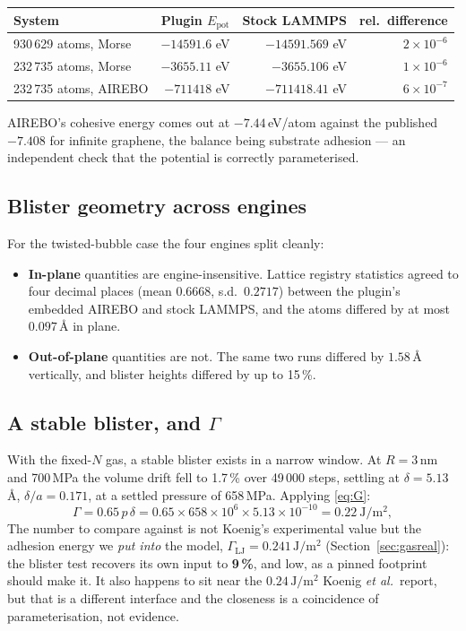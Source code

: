 \documentclass[11pt,a4paper]{article}
\begin{document}
\begin{table}[h]\centering\small
\begin{tabular}{lrrr}
\toprule
System & Plugin $E_\mathrm{pot}$ & Stock LAMMPS & rel.\ difference \\
\midrule
930\,629 atoms, Morse  & $-14591.6$ eV & $-14591.569$ eV & $2\times10^{-6}$ \\
232\,735 atoms, Morse  & $-3655.11$ eV & $-3655.106$ eV  & $1\times10^{-6}$ \\
232\,735 atoms, AIREBO & $-711418$ eV  & $-711418.41$ eV & $6\times10^{-7}$ \\
\bottomrule
\end{tabular}
\end{table}

AIREBO's cohesive energy comes out at $-7.44$\,eV/atom against the published
$-7.408$ for infinite graphene, the balance being substrate adhesion --- an
independent check that the potential is correctly parameterised.

\subsection{Blister geometry across engines}

For the twisted-bubble case the four engines split cleanly:

\begin{itemize}
\item \textbf{In-plane} quantities are engine-insensitive. Lattice registry
      statistics agreed to four decimal places (mean $0.6668$, s.d.\ $0.2717$)
      between the plugin's embedded AIREBO and stock LAMMPS, and the atoms
      differed by at most $0.097$\,\AA{} in plane.
\item \textbf{Out-of-plane} quantities are not. The same two runs differed by
      $1.58$\,\AA{} vertically, and blister heights differed by up to 15\,\%.
\end{itemize}

\subsection{A stable blister, and $\Gamma$}
\label{sec:gamma}

With the fixed-$N$ gas, a stable blister exists in a narrow window. At
$R = 3$\,nm and 700\,MPa the volume drift fell to 1.7\,\% over 49\,000 steps,
settling at $\delta = 5.13$\,\AA, $\delta/a = 0.171$, at a settled pressure of
658\,MPa. Applying \eqref{eq:G}:
\begin{equation}
\Gamma = 0.65\,p\,\delta
       = 0.65 \times 658\times10^{6} \times 5.13\times10^{-10}
       = 0.22\ \mathrm{J/m^2},
\end{equation}
The number to compare against is not Koenig's experimental value but the
adhesion energy we \emph{put into} the model,
$\Gamma_\mathrm{LJ} = 0.241\,\mathrm{J/m^2}$ (Section~\ref{sec:gasreal}): the
blister test recovers its own input to \textbf{9\,\%}, and low, as a pinned
footprint should make it. It also happens to sit near the
$0.24\,\mathrm{J/m^2}$ Koenig \textit{et al.}\ report, but that is a different
interface and the closeness is a coincidence of parameterisation, not evidence.
\end{document}
